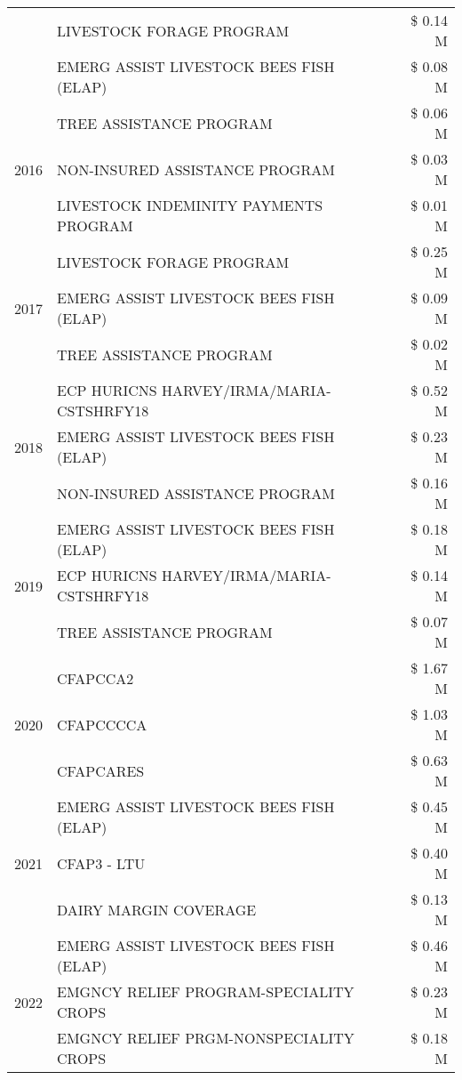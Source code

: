 \begin{tabular}{llr}
 & LIVESTOCK FORAGE PROGRAM & \$ 0.14 M \\
 & EMERG ASSIST LIVESTOCK BEES FISH (ELAP) & \$ 0.08 M \\
\cline{1-3}
\multirow[t]{3}{*}{2016} & TREE ASSISTANCE PROGRAM & \$ 0.06 M \\
 & NON-INSURED ASSISTANCE PROGRAM & \$ 0.03 M \\
 & LIVESTOCK INDEMINITY PAYMENTS PROGRAM & \$ 0.01 M \\
\cline{1-3}
\multirow[t]{3}{*}{2017} & LIVESTOCK FORAGE PROGRAM & \$ 0.25 M \\
 & EMERG ASSIST LIVESTOCK BEES FISH (ELAP) & \$ 0.09 M \\
 & TREE ASSISTANCE PROGRAM & \$ 0.02 M \\
\cline{1-3}
\multirow[t]{3}{*}{2018} & ECP HURICNS HARVEY/IRMA/MARIA-CSTSHRFY18 & \$ 0.52 M \\
 & EMERG ASSIST LIVESTOCK BEES FISH (ELAP) & \$ 0.23 M \\
 & NON-INSURED ASSISTANCE PROGRAM & \$ 0.16 M \\
\cline{1-3}
\multirow[t]{3}{*}{2019} & EMERG ASSIST LIVESTOCK BEES FISH (ELAP) & \$ 0.18 M \\
 & ECP HURICNS HARVEY/IRMA/MARIA-CSTSHRFY18 & \$ 0.14 M \\
 & TREE ASSISTANCE PROGRAM & \$ 0.07 M \\
\cline{1-3}
\multirow[t]{3}{*}{2020} & CFAPCCA2 & \$ 1.67 M \\
 & CFAPCCCCA & \$ 1.03 M \\
 & CFAPCARES & \$ 0.63 M \\
\cline{1-3}
\multirow[t]{3}{*}{2021} & EMERG ASSIST LIVESTOCK BEES FISH (ELAP) & \$ 0.45 M \\
 & CFAP3 - LTU & \$ 0.40 M \\
 & DAIRY MARGIN COVERAGE & \$ 0.13 M \\
\cline{1-3}
\multirow[t]{3}{*}{2022} & EMERG ASSIST LIVESTOCK BEES FISH (ELAP) & \$ 0.46 M \\
 & EMGNCY RELIEF PROGRAM-SPECIALITY CROPS & \$ 0.23 M \\
 & EMGNCY RELIEF PRGM-NONSPECIALITY CROPS & \$ 0.18 M \\
\cline{1-3}
\bottomrule
\end{tabular}
